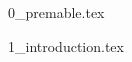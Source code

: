 \documentclass[ %
                    author={Oliver Ryan-George},
                supervisor={Dr. Miranda Mowbray},
                    degree={BSc},
                     title={Natural Language Processing in the Law Domain},
                  subtitle={},
                      year={2019} ]{resources/dissertation}
\begin{document}

\maketitle


\frontmatter


\makedecl



\newpage
{0_premable.tex}




\mainmatter

{1_introduction.tex}

\cleardoublepage

\begingroup
    \renewcommand\bibname{References \vspace*{-10mm}}
    \scriptsize
    \setlength\bibitemsep{5pt}
    \printbibliography
\endgroup
\end{document}
